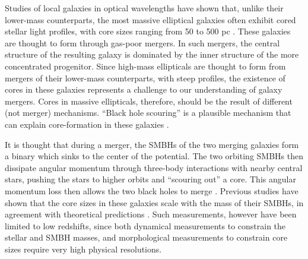 \documentclass[chicago]{emulateapj}
\begin{document}
Studies of local galaxies in optical wavelengths have shown that, unlike their lower-mass counterparts, the most massive elliptical galaxies often exhibit cored stellar light profiles, with core sizes ranging from 50 to 500 pc \citep[e.g.,][]{Ferrarese:06}. 
These galaxies are thought to form through gas-poor mergers. In such mergers, the central structure of the resulting galaxy is dominated by the inner structure of the more concentrated progenitor.  Since high-mass ellipticals are thought to form from mergers of their lower-mass counterparts, with steep profiles, the existence of cores in these galaxies represents a challenge to our understanding of galaxy mergers. Cores in massive ellipticals, therefore, should be the result of different (not merger) mechanisms.  
``Black hole scouring'' is a plausible mechanism that can explain core-formation in these galaxies \citep{Thomas:14}.

It is thought that during a merger, the SMBHs of the two merging galaxies form a binary which sinks to the center of the potential. The two orbiting SMBHs then dissipate angular momentum through three-body interactions with nearby central stars, pushing the stars to higher orbits and ``scouring out'' a core. This angular momentum loss then allows the two black holes to merge \citep{Begelman:80}.
Previous studies have shown that the core sizes in these galaxies scale with the mass of their SMBHs, in agreement with theoretical predictions \citep{Kormendy:09,Kormendy:13}.
Such measurements, however have been limited to low redshifts, since both dynamical measurements to constrain the stellar and SMBH masses, and morphological measurements to constrain core sizes require very high physical resolutions. 
\end{document}
